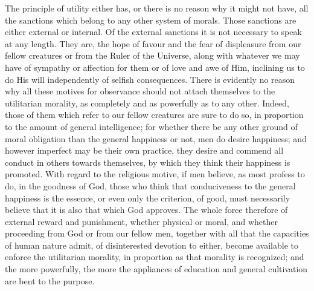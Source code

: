 \documentclass[12pt]{report}
\begin{document}
The principle of utility either has, or there is no reason why it might not have, all the sanctions which belong to any other system of morals. Those sanctions are either external or internal. Of the external sanctions it is not necessary to speak at any length. They are, the hope of favour and the fear of displeasure from our fellow creatures or from the Ruler of the Universe, along with whatever we may have of sympathy or affection for them or of love and awe of Him, inclining us to do His will independently of selfish consequences. There is evidently no reason why all these motives for observance should not attach themselves to the utilitarian morality, as completely and as powerfully as to any other. Indeed, those of them which refer to our fellow creatures are sure to do so, in proportion to the amount of general intelligence; for whether there be any other ground of moral obligation than the general happiness or not, men do desire happiness; and however imperfect may be their own practice, they desire and commend all conduct in others towards themselves, by which they think their happiness is promoted. With regard to the religious motive, if men believe, as most profess to do, in the goodness of God, those who think that conduciveness to the general happiness is the essence, or even only the criterion, of good, must necessarily believe that it is also that which God approves. The whole force therefore of external reward and punishment, whether physical or moral, and whether proceeding from God or from our fellow men, together with all that the capacities of human nature admit, of disinterested devotion to either, become available to enforce the utilitarian morality, in proportion as that morality is recognized; and the more powerfully, the more the appliances of education and general cultivation are bent to the purpose.
\end{document}
